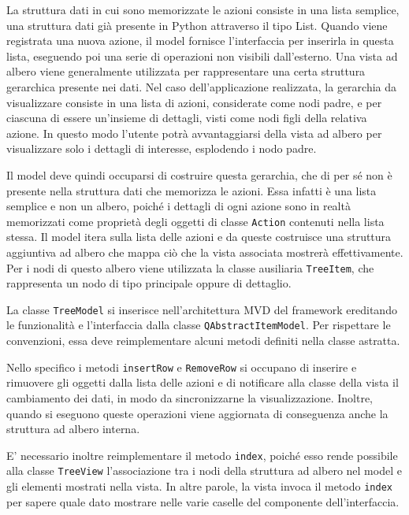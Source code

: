 La struttura dati in cui sono memorizzate le azioni consiste in una lista semplice, una struttura dati già presente in Python attraverso il tipo List. Quando viene registrata una nuova azione, il model fornisce l'interfaccia per inserirla in questa lista, eseguendo poi una serie di operazioni non visibili dall'esterno. Una vista ad albero viene generalmente utilizzata per rappresentare una certa struttura gerarchica presente nei dati. Nel caso dell'applicazione realizzata, la gerarchia da visualizzare consiste in una lista di azioni, considerate come nodi padre, e per ciascuna di essere un'insieme di dettagli, visti come nodi figli della relativa azione. In questo modo l'utente potrà avvantaggiarsi della vista ad albero per visualizzare solo i dettagli di interesse, esplodendo i nodo padre.

Il model deve quindi occuparsi di costruire questa gerarchia, che di per sé non è presente nella struttura dati che memorizza le azioni. Essa infatti è una lista semplice e non un albero, poiché i dettagli di ogni azione sono in realtà memorizzati come proprietà degli oggetti di classe \verb|Action| contenuti nella lista stessa. Il model itera sulla lista delle azioni e da queste costruisce una struttura aggiuntiva ad albero che mappa ciò che la vista associata mostrerà effettivamente. Per i nodi di questo albero viene utilizzata la classe ausiliaria \verb|TreeItem|, che rappresenta un nodo di tipo principale oppure di dettaglio.

La classe \verb|TreeModel| si inserisce nell'architettura MVD del framework ereditando le funzionalità e l'interfaccia dalla classe \verb|QAbstractItemModel|. Per rispettare le convenzioni, essa deve reimplementare alcuni metodi definiti nella classe astratta. 

Nello specifico i metodi \verb|insertRow| e \verb|RemoveRow| si occupano di inserire e rimuovere gli oggetti dalla lista delle azioni e di notificare alla classe della vista il cambiamento dei dati, in modo da sincronizzarne la visualizzazione. Inoltre, quando si eseguono queste operazioni viene aggiornata di conseguenza anche la struttura ad albero interna.

 

E' necessario inoltre reimplementare il metodo \verb|index|, poiché esso rende possibile alla classe \verb|TreeView| l'associazione tra i nodi della struttura ad albero nel model e gli elementi mostrati nella vista. In altre parole, la vista invoca il metodo \verb|index| per sapere quale dato mostrare nelle varie caselle del componente dell'interfaccia.

